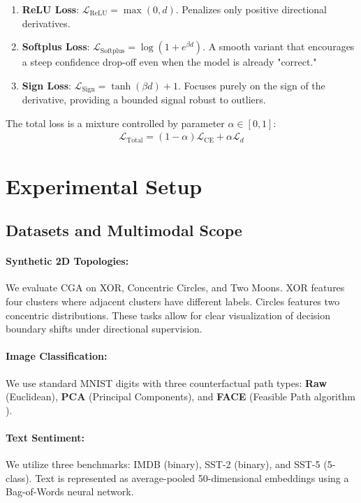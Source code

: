 \documentclass[sigconf,anonymous]{aamas}
\begin{document}
\begin{enumerate}
    \item \textbf{ReLU Loss}: $\mathcal{L}_{\text{ReLU}} = \max(0, d)$. Penalizes only positive directional derivatives.
    \item \textbf{Softplus Loss}: $\mathcal{L}_{\text{Softplus}} = \log(1 + e^{\beta d})$. A smooth variant that encourages a steep confidence drop-off even when the model is already "correct."
    \item \textbf{Sign Loss}: $\mathcal{L}_{\text{Sign}} = \tanh(\beta d) + 1$. Focuses purely on the sign of the derivative, providing a bounded signal robust to outliers.
\end{enumerate}

The total loss is a mixture controlled by parameter $\alpha \in [0,1]$:
\begin{align}\label{eq:lambda}
    \mathcal{L}_{\text{Total}} = (1-\alpha)\mathcal{L}_{\textrm{CE}} + \alpha \mathcal{L}_{d}
\end{align}

\section{Experimental Setup}
\label{sec:experimental_setup}

\subsection{Datasets and Multimodal Scope}
\paragraph{Synthetic 2D Topologies:} We evaluate CGA on XOR, Concentric Circles, and Two Moons. XOR features four clusters where adjacent clusters have different labels. Circles features two concentric distributions. These tasks allow for clear visualization of decision boundary shifts under directional supervision.
\paragraph{Image Classification:} We use standard MNIST digits with three counterfactual path types: \textbf{Raw} (Euclidean), \textbf{PCA} (Principal Components), and \textbf{FACE} (Feasible Path algorithm \cite{poyiadzi2020face}).
\paragraph{Text Sentiment:} We utilize three benchmarks: IMDB (binary), SST-2 (binary), and SST-5 (5-class). Text is represented as average-pooled 50-dimensional embeddings using a Bag-of-Words neural network.
\end{document}
